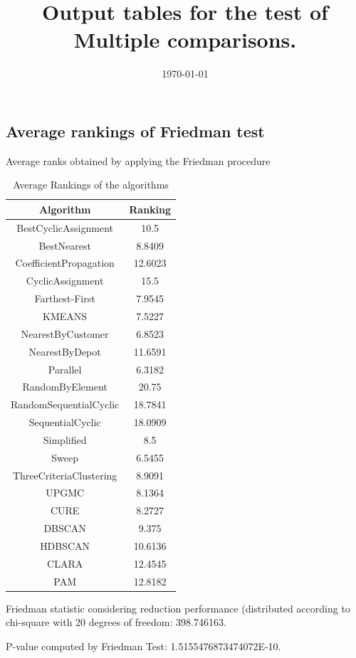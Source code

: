 \documentclass[a4paper,10pt]{article}
\title{Output tables for the test of Multiple comparisons.}
\author{}
\date{\today}
\begin{document}
\begin{landscape}
\pagestyle{empty}
\maketitle
\thispagestyle{empty}
\section{Average rankings of Friedman test}



Average ranks obtained by applying the Friedman procedure

\begin{table}[!htp]
\centering
\begin{tabular}{|c|c|}\hline
Algorithm&Ranking\\\hline
BestCyclicAssignment & 10.5\\
BestNearest & 8.8409\\
CoefficientPropagation & 12.6023\\
CyclicAssignment & 15.5\\
Farthest-First & 7.9545\\
KMEANS & 7.5227\\
NearestByCustomer & 6.8523\\
NearestByDepot & 11.6591\\
Parallel & 6.3182\\
RandomByElement & 20.75\\
RandomSequentialCyclic & 18.7841\\
SequentialCyclic & 18.0909\\
Simplified & 8.5\\
Sweep & 6.5455\\
ThreeCriteriaClustering & 8.9091\\
UPGMC & 8.1364\\
CURE & 8.2727\\
DBSCAN & 9.375\\
HDBSCAN & 10.6136\\
CLARA & 12.4545\\
PAM & 12.8182\\
\hline
\end{tabular}
\caption{Average Rankings of the algorithms}
\end{table}

Friedman statistic considering reduction performance (distributed according to chi-square with 20 degrees of freedom: 398.746163.

P-value computed by Friedman Test: 1.5155476873474072E-10.\newline


\end{landscape}
\end{document}
